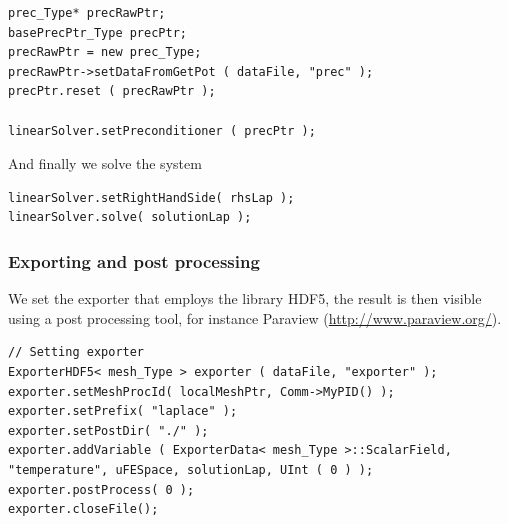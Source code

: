 \begin{itemize}
\begin{lstlisting}
prec_Type* precRawPtr;
basePrecPtr_Type precPtr;
precRawPtr = new prec_Type;
precRawPtr->setDataFromGetPot ( dataFile, "prec" );
precPtr.reset ( precRawPtr );

linearSolver.setPreconditioner ( precPtr );
\end{lstlisting}
And finally we solve the system
\begin{lstlisting}
linearSolver.setRightHandSide( rhsLap );
linearSolver.solve( solutionLap );
\end{lstlisting}



\subsubsection*{Exporting and post processing}
We set the exporter that employs the library HDF5, the result is then visible using a post processing tool, for instance Paraview (\url{http://www.paraview.org/}).
\begin{lstlisting}
// Setting exporter
ExporterHDF5< mesh_Type > exporter ( dataFile, "exporter" );
exporter.setMeshProcId( localMeshPtr, Comm->MyPID() );
exporter.setPrefix( "laplace" );
exporter.setPostDir( "./" );
exporter.addVariable ( ExporterData< mesh_Type >::ScalarField, "temperature", uFESpace, solutionLap, UInt ( 0 ) );
exporter.postProcess( 0 );
exporter.closeFile();
\end{lstlisting}


\end{itemize}
